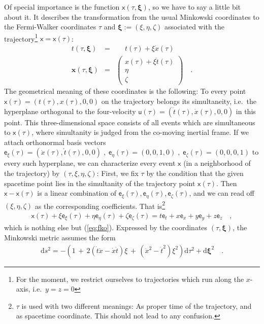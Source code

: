\documentclass[a4paper,12pt]{article}
\newcommand{\vx}{\mathbf{x}}
\newcommand{\vxi}{\boldsymbol{\xi}}
\newcommand{\vvx}{\mathsf x}
\newcommand{\vvu}{\mathsf u}
\newcommand{\vve}{\mathsf e}
\renewcommand{\d}{\mathrm{d}}
\begin{document}
Of special importance is the function $\vvx(\tau,\vxi)$, so we have to say a little
bit about it.
It describes the transformation from the usual Minkowski coordinates to the
Fermi-Walker coordinates $\tau$ and $\vxi:=(\xi,\eta,\zeta)$ associated with the 
trajectory\footnote{For the moment, we restrict ourselves to trajectories which run along 
the $x$-axis, i.e.\ $y=z=0$} $\vvx=\vvx(\tau)$:
\begin{eqnarray}
\label{eq:fko}
t(\tau,\vxi)&=&\quad\; t(\tau)+\xi{\dot x}(\tau)\nonumber \\
\vx(\tau,\vxi)&=&\left( \begin{array}{c} x(\tau)+\xi{\dot t}(\tau)\\
\eta \\ \zeta 
\end{array} \right)\quad.
\end{eqnarray}
The geometrical meaning of these coordinates is the following: To every point 
$\vvx(\tau)=(t(\tau),x(\tau),0,0)$ on the trajectory belongs its simultaneity,
i.e.\ the hyperplane orthogonal to the four-velocity 
$\vvu(\tau)=(\dot{t}(\tau),\dot{x}(\tau),0,0)$ in this point. This three-dimensional
space consists of all events which are simultaneous to $\vvx(\tau)$, where simultanity
is judged from the co-moving inertial frame. If we attach orthonormal basis vectors 
$\vve_{\xi}(\tau)=({\dot x}(\tau),{\dot t}(\tau),0,0)\;,\;
\vve_{\eta}(\tau)=(0,0,1,0)\;,\;\vve_{\zeta}(\tau)=(0,0,0,1)$ to every such hyperplane,
we can characterize every event $\vvx$ (in a neighborhood of the trajectory) by
$(\tau,\xi,\eta,\zeta)$: First, we fix $\tau$ by the condition that the given 
spacetime point lies in the simultanity of the trajectory point $\vvx(\tau)$. 
Then $\vvx-\vvx(\tau)$ is a linear combination of $\vve_{\xi}(\tau),\vve_{\eta}(\tau),
\vve_{\zeta}(\tau)$, and we can read off $(\xi,\eta,\zeta)$ as the corresponding
coefficients. That is\footnote{$\tau$ is used with two different meanings: As proper time 
of the trajectory, and as spacetime coordinate. This should not lead to any confusion.} 
\begin{eqnarray*}
\vvx(\tau)+\xi\vve_{\xi}(\tau)+\eta\vve_{\eta}(\tau)+\zeta\vve_{\zeta}(\tau)=
t\vve_t+x\vve_x+y\vve_y+z\vve_z\quad,
\end{eqnarray*}
which is nothing else but (\ref{eq:fko}). 
Expressed by the coordinates $(\tau,\vxi)$, the Minkowski metric assumes the form
\begin{eqnarray*}
\d s^2=-\left(1\,+\,2({\dot t}{\ddot x}-{\dot x}{\ddot t})\xi
\,+\,({\ddot x}^2-{\ddot t}^2)\xi^2\right)\d\tau^2+\d\vxi^2\quad.
\end{eqnarray*}
\end{document}
